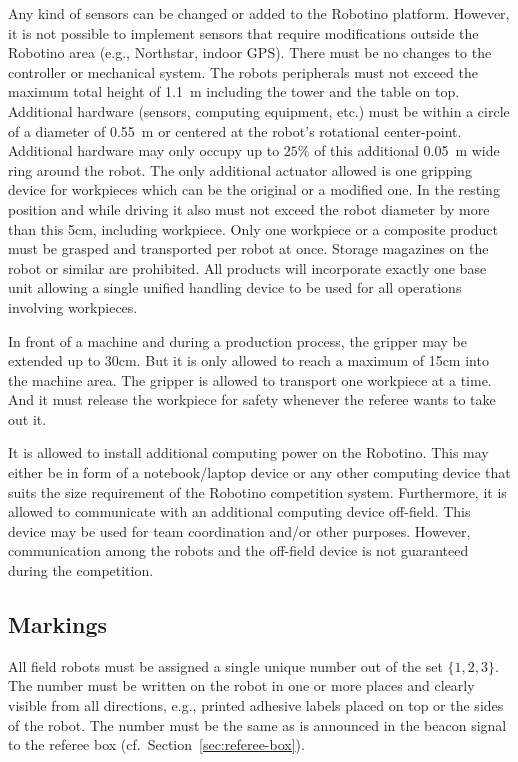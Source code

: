 \documentclass[12pt,twoside]{article}
\newcommand{\Robotino}{Robotino}
\newcommand{\refsec}[1]{Section~\ref{#1}}
\begin{document}
Any kind of sensors can be changed or added to the Robotino platform.
However, it is not possible to implement sensors that require
modifications outside the Robotino area (e.g., Northstar, indoor GPS).
There must be no changes to the controller or mechanical system.
The robots peripherals must not exceed the maximum total height of
\SI{1.1}{\metre} including the tower and the table on top. Additional
hardware (sensors, computing equipment, etc.)  must be within a circle
of a diameter of \SI{0.55}{\metre} or centered at the robot's rotational
center-point. Additional hardware may only occupy up to $25\%$ of this
additional \SI{0.05}{\metre} wide ring around the
robot. The only additional actuator allowed is one gripping device for
workpieces which can be the original or a modified one. In the resting
position and while driving it also must not exceed the robot diameter by
more than this 5cm, including workpiece.
Only one workpiece or a composite product must be grasped and
transported per robot at once. Storage magazines on the robot or
similar are prohibited. All products will incorporate exactly one base
unit allowing a single unified handling device to be used for all
operations involving workpieces.

In front of a machine and during a production process, the gripper may
be extended up to 30cm. But it is only allowed to reach a maximum of
15cm into the machine area.
The gripper is allowed to transport one workpiece at a time. And it must
release the workpiece for safety whenever the referee wants to take out it.

It is allowed to install additional computing power on the
\Robotino. This may either be in form of a notebook/laptop device or
any other computing device that suits the size requirement of the
\Robotino{} competition system. Furthermore, it is allowed to
communicate with an additional computing device off-field. This device
may be used for team coordination and/or other purposes. However,
communication among the robots and the off-field device is not
guaranteed during the competition.

\subsection{Markings}
\label{sec:robot-markings}
All field robots must be assigned a single unique number out of the
set $\{1, 2, 3\}$. The number must be written on the robot in one or
more places and clearly visible from all directions, e.g., printed
adhesive labels placed on top or the sides of the robot. The number
must be the same as is announced in the beacon signal to the referee
box (cf.~\refsec{sec:referee-box}).
\end{document}
